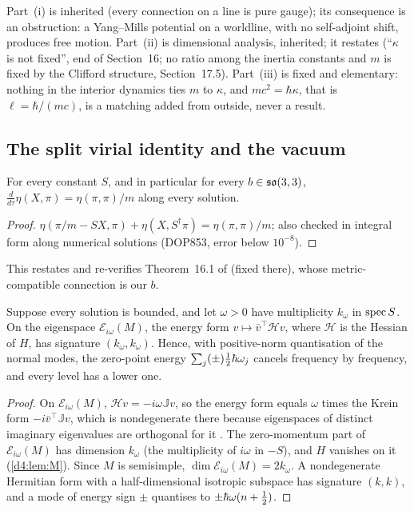 Part~(i) is inherited (every connection on a line is pure gauge); its consequence is an obstruction: a Yang--Mills potential on a worldline,
with no self-adjoint shift, produces free motion. Part~(ii) is dimensional analysis, inherited; it restates \cite{ES17} (``$\kappa$ is not
fixed'', end of Section~16; no ratio among the inertia constants and $m$ is fixed by the Clifford structure, Section~17.5). Part~(iii) is fixed
and elementary: nothing in the interior dynamics ties $m$ to $\kappa$, and $mc^2=\hbar\kappa$, that is $\ell=\hbar/(mc)$, is a matching added from
outside, never a result.

\subsection{The split virial identity and the vacuum}
\label{d4:sec:vacuum}

\begin{proposition}
\label{d4:prop:virial}
For every constant $S$, and in particular for every $b\in\mathfrak{so}(3,3)$, $\frac d{d\tau}\eta(X,\pi)=\eta(\pi,\pi)/m$ along every solution.
\end{proposition}

\begin{proof}
$\eta(\pi/m-SX,\pi)+\eta(X,S^\dagger\pi)=\eta(\pi,\pi)/m$; also checked in integral form along numerical solutions (DOP853, error below $10^{-8}$).
\end{proof}

This restates and re-verifies Theorem~16.1 of \cite{ES17} (fixed there), whose metric-compatible connection is our $b$.

\begin{theorem}
\label{d4:thm:krein}
Suppose every solution is bounded, and let $\omega>0$ have multiplicity $k_\omega$ in $\operatorname{spec} S$. On the eigenspace $\mathcal E_{i\omega}(M)$, the energy form
$v\mapsto\bar v^{\!\top}\mathcal Hv$, where $\mathcal H$ is the Hessian of $H$, has signature $(k_\omega,k_\omega)$. Hence, with positive-norm
quantisation of the normal modes, the zero-point energy $\sum_j(\pm)\tfrac12\hbar\omega_j$ cancels frequency by frequency, and every level has a lower
one.
\end{theorem}

\begin{proof}
On $\mathcal E_{i\omega}(M)$, $\mathcal Hv=-i\omega\mathbb Jv$, so the energy form equals $\omega$ times the Krein form $-i\bar v^{\!\top}\mathbb Jv$, which is
nondegenerate there because eigenspaces of distinct imaginary eigenvalues are orthogonal for it \cite{YakubovichStarzhinskii75}. The
zero-momentum part of $\mathcal E_{i\omega}(M)$ has dimension $k_\omega$ (the multiplicity of $i\omega$ in $-S$), and $H$ vanishes on it (\cref{d4:lem:M}).
Since $M$ is semisimple, $\dim\mathcal E_{i\omega}(M)=2k_\omega$. A nondegenerate Hermitian form with a half-dimensional isotropic subspace has signature
$(k,k)$, and a mode of energy sign $\pm$ quantises to $\pm\hbar\omega(n+\tfrac12)$.
\end{proof}

